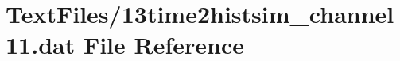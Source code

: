 \hypertarget{13time2histsim__channel11_8dat}{}\section{Text\+Files/13time2histsim\+\_\+channel11.dat File Reference}
\label{13time2histsim__channel11_8dat}
